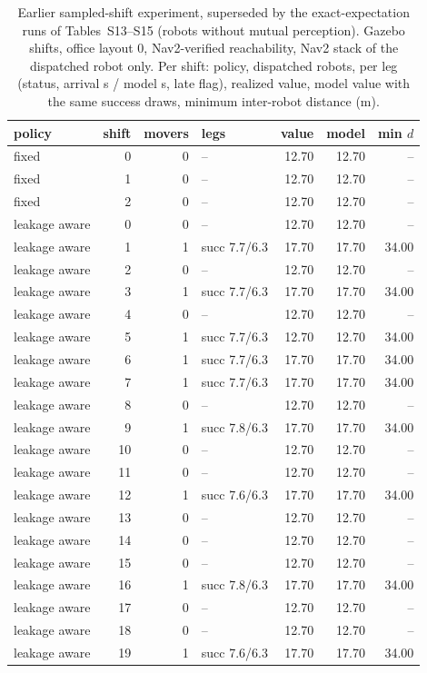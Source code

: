 \begin{table}[h]\centering\caption{Earlier sampled-shift experiment, superseded by the exact-expectation runs of Tables~S13--S15 (robots without mutual perception). Gazebo shifts, office layout 0, Nav2-verified reachability, Nav2 stack of the dispatched robot only. Per shift: policy, dispatched robots, per leg (status, arrival s / model s, late flag), realized value, model value with the same success draws, minimum inter-robot distance (m).}\scriptsize
\begin{tabular}{@{}lrrp{3.9cm}rrr@{}}\toprule policy & shift & movers & legs & value & model & min $d$\\\midrule
fixed & 0 & 0 & -- & 12.70 & 12.70 & --\\
fixed & 1 & 0 & -- & 12.70 & 12.70 & --\\
fixed & 2 & 0 & -- & 12.70 & 12.70 & --\\
leakage aware & 0 & 0 & -- & 12.70 & 12.70 & --\\
leakage aware & 1 & 1 & succ 7.7/6.3 & 17.70 & 17.70 & 34.00\\
leakage aware & 2 & 0 & -- & 12.70 & 12.70 & --\\
leakage aware & 3 & 1 & succ 7.7/6.3 & 17.70 & 17.70 & 34.00\\
leakage aware & 4 & 0 & -- & 12.70 & 12.70 & --\\
leakage aware & 5 & 1 & succ 7.7/6.3 & 12.70 & 12.70 & 34.00\\
leakage aware & 6 & 1 & succ 7.7/6.3 & 17.70 & 17.70 & 34.00\\
leakage aware & 7 & 1 & succ 7.7/6.3 & 17.70 & 17.70 & 34.00\\
leakage aware & 8 & 0 & -- & 12.70 & 12.70 & --\\
leakage aware & 9 & 1 & succ 7.8/6.3 & 17.70 & 17.70 & 34.00\\
leakage aware & 10 & 0 & -- & 12.70 & 12.70 & --\\
leakage aware & 11 & 0 & -- & 12.70 & 12.70 & --\\
leakage aware & 12 & 1 & succ 7.6/6.3 & 17.70 & 17.70 & 34.00\\
leakage aware & 13 & 0 & -- & 12.70 & 12.70 & --\\
leakage aware & 14 & 0 & -- & 12.70 & 12.70 & --\\
leakage aware & 15 & 0 & -- & 12.70 & 12.70 & --\\
leakage aware & 16 & 1 & succ 7.8/6.3 & 17.70 & 17.70 & 34.00\\
leakage aware & 17 & 0 & -- & 12.70 & 12.70 & --\\
leakage aware & 18 & 0 & -- & 12.70 & 12.70 & --\\
leakage aware & 19 & 1 & succ 7.6/6.3 & 17.70 & 17.70 & 34.00\\
\bottomrule\end{tabular}\end{table}
